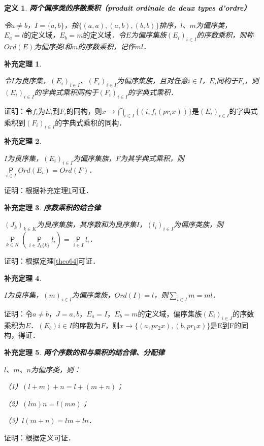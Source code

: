 \documentclass[12pt, a4paper, oneside]{book}
\newtheorem{cor}{补充定理}
\newtheorem{de}{定义}
\begin{document}
			\begin{de}
				\textbf{两个偏序类的序数乘积（produit ordinale de deux types d'ordre）}
				\par
				令$a\neq b$，$I=\{a, b\}$，按$\{(a, a), (a, b), (b, b)\}$排序，$l$、$m$为偏序类，$E_a=l\text{的定义域}$，$E_b=m\text{的定义域}$．令$E$为偏序集族$(E_i)_{i\in I}$的序数乘积，则称$Ord(E)$为偏序类$l$和$m$的序数乘积，记作$ml$．
			\end{de}
			
			\begin{cor}\label{cor241}
				\hfill\par
				令$I$为良序集，$(E_i)_{i\in I}$、$(F_i)_{i\in I}$为偏序集族，且对任意$i\in I$，$E_i$同构于$F_i$，则$(E_i)_{i\in I}$的字典式乘积同构于$(F_i)_{i\in I}$的字典式乘积．
			\end{cor}
			证明：令$f_i$为$E_i$到$F_i$的同构，则$x\to\bigcap\limits_{i\in I}\{(i, f_i(pr_ix))\}$是$(E_i)_{i\in I}$的字典式乘积到$(F_i)_{i\in I}$的字典式乘积的同构．
			
			\begin{cor}\label{cor242}
				\hfill\par
				$I$为良序集，$(E_i)_{i\in I}$为偏序集族，$F$为其字典式乘积，则$\mathop{\mathsf{P}}\limits_{i\in I}Ord(E_i)=Ord(F)$．
			\end{cor}
			证明：根据补充定理\ref{cor241}可证．
			
			\begin{cor}\label{cor243}
				\textbf{序数乘积的结合律}
				\par
				$(J_k)_{k\in K}$为良序集族，其序数和为良序集$I$，$(l_i)_{i\in I}$为偏序类族，则$\mathop{\mathsf{P}}\limits_{k\in K}(\mathop{\mathsf{P}}\limits_{i\in J_k\{k\}}l_i)=\mathop{\mathsf{P}}\limits_{i\in I}l_i$．
			\end{cor}
			证明：根据定理\ref{theo64}可证．
			
			\begin{cor}\label{cor244}
				\hfill\par
				$I$为良序集，$(m)_{i\in I}$为偏序类族，$Ord(I)=l$，则$\sum\limits_{i\in I}m=ml$．
			\end{cor}
			证明：令$a\neq b$，$J={a, b}$，$E_a=I$，$E_b=m$的定义域，偏序集族$(E_i)_{i\in J}$的序数乘积为$E$．$(E_b)i\in I$的序数为$F$，则$x\to\{(a, pr_2x), (b, pr_1x)\}$是E到F的同构，得证．
			
			\begin{cor}\label{cor245}
				\textbf{两个序数的和与乘积的结合律、分配律}
				\par
				$l$、$m$、$n$为偏序类，则：
				\par
				（1）$(l+m)+n=l+(m+n)$；
				\par
				（2）$(lm)n=l(mn)$；
				\par
				（3）$l(m+n)=lm+ln$．
			\end{cor}
			证明：根据定义可证．
			
\end{document}
